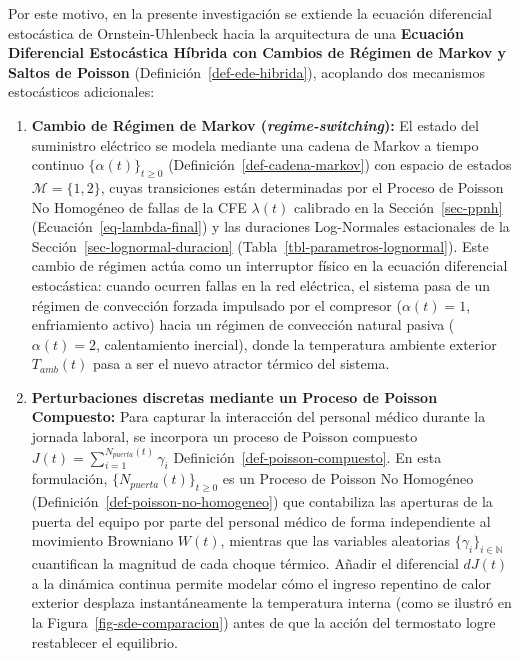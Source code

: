 \documentclass[
  spanish,
  us-letterpaper,
]{scrreprt}
\providecommand{\tightlist}{%
  \setlength{\itemsep}{0pt}\setlength{\parskip}{0pt}}
\numberwithin{equation}{section}
\theoremstyle{plain}
\theoremstyle{plain}
\theoremstyle{plain}
\theoremstyle{definition}
\theoremstyle{remark}
\begin{document}
Por este motivo, en la presente investigación se extiende la ecuación
diferencial estocástica de Ornstein-Uhlenbeck hacia la arquitectura de
una \textbf{Ecuación Diferencial Estocástica Híbrida con Cambios de
Régimen de Markov y Saltos de Poisson}
(Definición~\ref{def-ede-hibrida}), acoplando dos mecanismos
estocásticos adicionales:

\begin{enumerate}
\def\labelenumi{\arabic{enumi}.}
\tightlist
\item
  \textbf{Cambio de Régimen de Markov (\emph{regime-switching}):} El
  estado del suministro eléctrico se modela mediante una cadena de
  Markov a tiempo continuo \(\{\alpha(t)\}_{t \ge 0}\)
  (Definición~\ref{def-cadena-markov}) con espacio de estados
  \(\mathcal{M} = \{1, 2\}\), cuyas transiciones están determinadas por
  el Proceso de Poisson No Homogéneo de fallas de la CFE \(\lambda(t)\)
  calibrado en la Sección~\ref{sec-ppnh}
  (Ecuación~\ref{eq-lambda-final}) y las duraciones Log-Normales
  estacionales de la Sección~\ref{sec-lognormal-duracion}
  (Tabla~\ref{tbl-parametros-lognormal}). Este cambio de régimen actúa
  como un interruptor físico en la ecuación diferencial estocástica:
  cuando ocurren fallas en la red eléctrica, el sistema pasa de un
  régimen de convección forzada impulsado por el compresor
  (\(\alpha(t) = 1\), enfriamiento activo) hacia un régimen de
  convección natural pasiva (\(\alpha(t) = 2\), calentamiento inercial),
  donde la temperatura ambiente exterior \(T_{amb}(t)\) pasa a ser el
  nuevo atractor térmico del sistema.
\item
  \textbf{Perturbaciones discretas mediante un Proceso de Poisson
  Compuesto:} Para capturar la interacción del personal médico durante
  la jornada laboral, se incorpora un proceso de Poisson compuesto
  \(\displaystyle J(t) = \sum_{i=1}^{N_{puerta}(t)} \gamma_i\)
  Definición~\ref{def-poisson-compuesto}. En esta formulación,
  \(\{N_{puerta}(t)\}_{t \ge 0}\) es un Proceso de Poisson No Homogéneo
  (Definición~\ref{def-poisson-no-homogeneo}) que contabiliza las
  aperturas de la puerta del equipo por parte del personal médico de
  forma independiente al movimiento Browniano \(W(t)\), mientras que las
  variables aleatorias \(\{\gamma_i\}_{i \in \mathbb{N}}\) cuantifican
  la magnitud de cada choque térmico. Añadir el diferencial \(dJ(t)\) a
  la dinámica continua permite modelar cómo el ingreso repentino de
  calor exterior desplaza instantáneamente la temperatura interna (como
  se ilustró en la Figura~\ref{fig-sde-comparacion}) antes de que la
  acción del termostato logre restablecer el equilibrio.
\end{enumerate}
\end{document}
